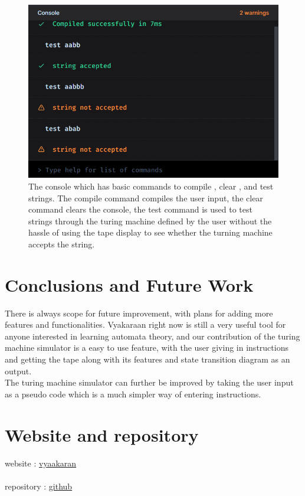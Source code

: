 \documentclass[12pt]{report}
\begin{document}
\begin{figure}[H]
  \includegraphics[width=\columnwidth ]{consoleOutput.png}
  \caption{The console which has basic commands to compile , clear , and test strings. The compile command compiles the user input, the clear command clears the console, the test command is used to test strings through the turing machine defined by the user without the hassle of using the tape display to see whether the turning machine accepts the string.}
\end{figure}



\chapter{Conclusions and Future Work}
There is always scope for future improvement, with plans for adding more features and functionalities. Vyakaraan right now is still a very useful tool for anyone interested in learning automata theory, and our contribution of the turing machine simulator is a easy to use feature, with the user giving in instructions and getting the tape along with its features and state transition diagram as an output. \\
The turing machine simulator can further be improved by taking the user input as a pseudo code which is a much simpler way of entering instructions.


 

\appendix 
\chapter{Website and repository}
website :
\href{https://vyaakaran.vercel.app/}{vyaakaran}\\\\
repository : 
\href{https://github.com/blenderskool/vyaakaran}{github}
\end{document}
